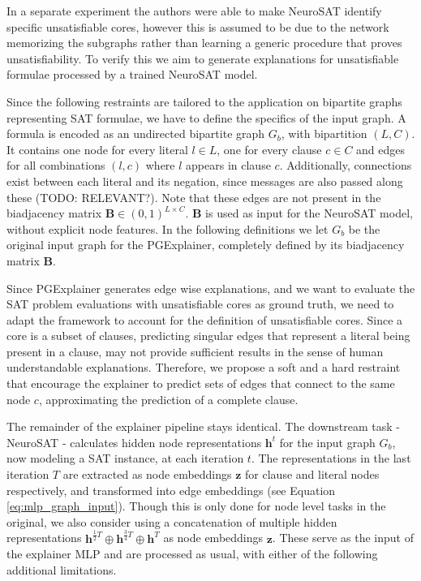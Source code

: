 In a separate experiment the authors were able to make NeuroSAT identify specific unsatisfiable cores, however this is assumed to be due to the network memorizing the subgraphs rather than learning a generic procedure that proves unsatisfiability. To verify this we aim to generate explanations for unsatisfiable formulae processed by a trained NeuroSAT model.

Since the following restraints are tailored to the application on bipartite graphs representing SAT formulae, we have to define the specifics of the input graph. A formula is encoded as an undirected bipartite graph $G_b$, with bipartition $(L,C)$. It contains one node for every literal $l \in L$, one for every clause $c \in C$ and edges for all combinations $(l,c)$ where $l$ appears in clause $c$. Additionally, connections exist between each literal and its negation, since messages are also passed along these (TODO: RELEVANT?). Note that these edges are not present in the biadjacency matrix $\mathbf{B}\in (0,1)^{L\times C}$. $\mathbf{B}$ is used as input for the NeuroSAT model, without explicit node features. In the following definitions we let $G_b$ be the original input graph for the PGExplainer, completely defined by its biadjacency matrix $\mathbf{B}$.


Since PGExplainer generates edge wise explanations, and we want to evaluate the SAT problem evaluations with unsatisfiable cores as ground truth, we need to adapt the framework to account for the definition of unsatisfiable cores. Since a core is a subset of clauses, predicting singular edges that represent a literal being present in a clause, may not provide sufficient results in the sense of human understandable explanations. Therefore, we propose a soft and a hard restraint that encourage the explainer to predict sets of edges that connect to the same node $c$, approximating the prediction of a complete clause.

The remainder of the explainer pipeline stays identical. The downstream task - NeuroSAT - calculates hidden node representations $\mathbf{h}^t$ for the input graph $G_b$, now modeling a SAT instance, at each iteration $t$. The representations in the last iteration $T$ are extracted as node embeddings $\mathbf{z}$ for clause and literal nodes respectively, and transformed into edge embeddings (see Equation \ref{eq:mlp_graph_input}). Though this is only done for node level tasks in the original, we also consider using a concatenation of multiple hidden representations $\mathbf{h}^{\frac{1}{2}T} \oplus \mathbf{h}^{\frac{3}{4}T} \oplus \mathbf{h}^T$ as node embeddings $\mathbf{z}$. These serve as the input of the explainer MLP and are processed as usual, with either of the following additional limitations. \bigskip


